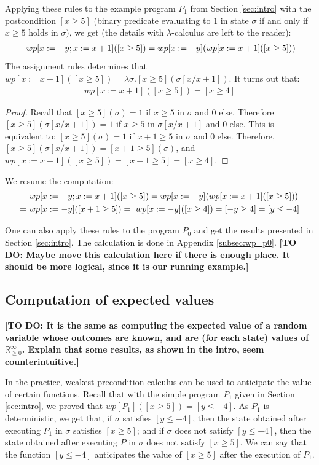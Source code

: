\documentclass[a4paper,10pt]{llncs}
\def\RRposi {{\mathbb R_{\geq 0}^{\infty}}}
\newcommand\todo[1]{{\color{red}\textbf{[TO DO:  #1]}}}
\begin{document}
Applying these rules to the example program $P_1$ from Section \ref{sec:intro} with the postcondition $[x \geq 5]$ (binary predicate evaluating to $1$ in state $\sigma$ if and only if $x \geq 5$ holds in $\sigma)$, we get (the details with $\lambda$-calculus are left to the reader):
\begin{align*}
 \textnormal{ }wp[x := - y ; x := x+1]([x \geq 5]) = wp[x := - y ](wp[x := x+1]([x \geq 5]))
\end{align*}
The assignment rules determines that $wp[x := x+1]([x \geq 5]) = \lambda\sigma. [x \geq 5](\sigma[x/x+1])$.
It turns out that:
\begin{align*}
wp[x := x+1]([x \geq 5]) = [x \geq 4]
\end{align*}
\begin{proof}
Recall that $[x \geq 5](\sigma) = 1$ if $x \geq 5$ in $\sigma$ and $0$ else. Therefore $[x \geq 5](\sigma[x/x+1]) = 1$ if $x \geq 5$ in $\sigma[x/x+1]$ and $0$ else. This is equivalent to: $[x \geq 5](\sigma) = 1$ if $x+1 \geq 5$ in $\sigma$ and $0$ else. Therefore, $[x \geq 5](\sigma[x/x+1]) = [x+1 \geq 5](\sigma)$, and $wp[x := x+1]([x \geq 5]) = [x+1 \geq 5] = [x \geq 4]$.
\end{proof}
 We resume the computation:
\begin{align*}
& \textnormal{ }wp[x := - y ; x := x+1]([x \geq 5]) = wp[x := - y ](wp[x := x+1]([x \geq 5])) \\
 =& \textnormal{ }wp[x := - y ]([x+1 \geq 5]) = \textnormal{ }wp[x := - y ]([x \geq 4]) = [-y \geq 4] = [y \leq -4] \\
\end{align*}

	One can also apply these rules to the program $P_0$ and get the results presented in Section \ref{sec:intro}. The calculation is done in Appendix \ref{subsec:wp_p0}. \todo{Maybe move this calculation here if there is enough place. It should be more logical, since it is our running example.}
	
	\subsection{Computation of expected values}
	\todo{It is the same as computing the expected value of a random variable whose outcomes are known, and are (for each state) values of $\RRposi$. Explain that some results, as shown in the intro, seem counterintuitive.}
	
	In the practice, weakest precondition calculus can be used to anticipate the value of certain functions. Recall that with the simple program $P_1$ given in Section \ref{sec:intro}, we proved that $wp[P_1]([x \geq 5]) = [y \leq -4]$. As $P_1$ is deterministic, we get that, if $\sigma$ satisfies $[y \leq -4]$, then the state obtained after executing $P_1$ in $\sigma$ satisfies $[x \geq 5]$; and if $\sigma$ does not satisfy $[y \leq -4]$, then the state obtained after executing $P$ in $\sigma$ does not satisfy $[x \geq 5]$. We can say that the function $[y \leq -4]$ anticipates the value of $[x \geq 5]$ after the execution of $P_1$.\bigskip
	
\end{document}
